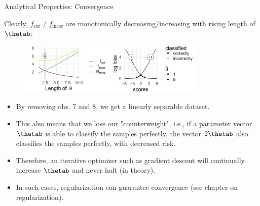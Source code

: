 \begin{vbframe}{Analytical Properties: Convergence}



Clearly, $f_{\text{cor}}$ / $f_{\text{incor}}$ are monotonically decreasing/increasing with rising length of $\thetab$:

\begin{figure}
\includegraphics[width=0.8\textwidth]{figure_man/undet-problem02.png}\\
\end{figure}

\begin{itemize}
\item By removing obs. 7 and 8, we get a linearly separable dataset. \\
\item This also means that we lose our "counterweight", i.e., if a parameter vector $\thetab$ is able to classify the samples perfectly, the vector $2\thetab$ also classifies the samples perfectly, with decreased risk.
\item Therefore, an iterative optimizer such as gradient descent will continually increase $\thetab$ and never halt (in theory).
\item In such cases, regularization can guarantee convergence (see chapter on regularization). 
\end{itemize}

\end{vbframe}









